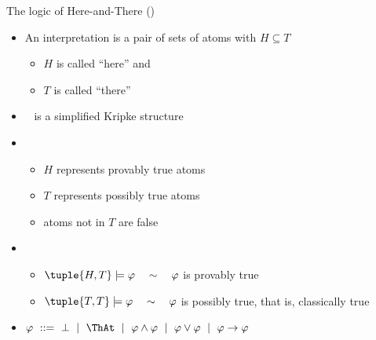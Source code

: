 \begin{frame}{The logic of Here-and-There (\HT)}
  \begin{itemize}
  \item<1-> An \alert{interpretation} is a pair  of sets of atoms with $H \subseteq T$
    \begin{itemize}
    \item $H$ is called ``here'' and
    \item $T$ is called ``there''
    \end{itemize}
  \item<2->  \  is a simplified Kripke structure
    \medskip
  \item<3->  \
    \begin{itemize}
    \item $H$ represents provably true atoms
    \item $T$ represents possibly true atoms
    \item atoms not in $T$ are false
    \end{itemize}
    \medskip
  \item<4-> 
    \begin{itemize}
    \item $\tuple{H,T}\models\varphi\quad \sim\quad \varphi$ is provably true
    \item $\tuple{T,T}\models\varphi\quad \sim\quad \varphi$ is possibly true\pause[5], that is, classically true
    \end{itemize}
  \item<3-> 
    \(
      \varphi \ ::= \ \bot \ \mid \ \ThAt\ \mid \ \varphi \land \varphi \ \mid \  \varphi \lor \varphi \ \mid \  \varphi \rightarrow \varphi
    \)
  \end{itemize}
\end{frame}
